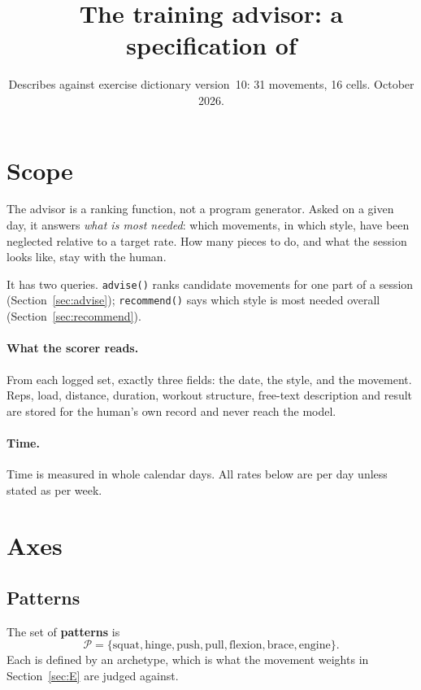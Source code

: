 \documentclass[11pt]{article}
\title{The training advisor: a specification of \code{advisor.py}}
\author{}
\date{Describes \code{src/training/advisor.py} against exercise dictionary
version~10: 31 movements, 16 cells. October 2026.}
\theoremstyle{plain}
\theoremstyle{definition}
\newcommand{\code}[1]{\texttt{#1}}
\newcommand{\Pat}{\mathcal{P}}
\begin{document}
\maketitle
\tableofcontents

\section{Scope}

The advisor is a ranking function, not a program generator. Asked on a
given day, it answers \emph{what is most needed}: which movements, in
which style, have been neglected relative to a target rate. How many
pieces to do, and what the session looks like, stay with the human.

It has two queries. \code{advise()} ranks candidate movements for one
part of a session (Section~\ref{sec:advise}); \code{recommend()} says
which style is most needed overall (Section~\ref{sec:recommend}).

\paragraph{What the scorer reads.} From each logged set, exactly three
fields: the date, the style, and the movement. Reps, load, distance,
duration, workout structure, free-text description and result are stored
for the human's own record and never reach the model.

\paragraph{Time.} Time is measured in whole calendar days. All rates
below are per day unless stated as per week.

\section{Axes}

\subsection{Patterns}

The set of \textbf{patterns} is
\[
\Pat = \{\mathrm{squat}, \mathrm{hinge}, \mathrm{push}, \mathrm{pull},
\mathrm{flexion}, \mathrm{brace}, \mathrm{engine}\}.
\]
Each is defined by an archetype, which is what the movement weights in
Section~\ref{sec:E} are judged against.
\end{document}
